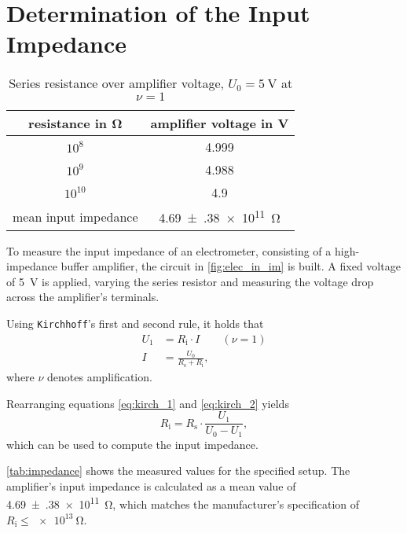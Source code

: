 \section{Determination of the Input Impedance}
\begin{table}[b!]
	\centering
	\caption[Series resistance over amplifier voltage]{Series resistance over amplifier voltage, $U_0=\SI{5}{\volt}$ at $\nu=1$}
	\label{tab:impedance}
	\begin{tabular}{cS}
		\toprule
		{resistance in \si{\ohm}}	&	{amplifier voltage in \si{\volt}}	\\
		\midrule
			$10^8$	&	4.999	\\
			$10^9$	&	4.988	\\
			$10^{10}$	&	4.9	\\
		\midrule
		{mean input impedance}	&	\SI{4.69(38)e11}{\ohm}\\
		\bottomrule
	\end{tabular}
\end{table}
To measure the input impedance of an electrometer, consisting of a high-impedance buffer amplifier, the circuit in \autoref{fig:elec_in_im} is built.
A fixed voltage of \SI{5}{\volt} is applied, varying the series resistor and measuring the voltage drop across the amplifier's terminals.

Using \texttt{Kirchhoff}'s first and second rule, it holds that
\begin{align}
	U_1	&= 	R_\text{i}\cdot I \label{eq:kirch_1}\qquad(\nu = 1)\\
	I 					&=	\frac{U_0}{R_\text{s}+R_\text{i}},	\label{eq:kirch_2}
\end{align}
where $\nu$ denotes amplification.

Rearranging equations \ref{eq:kirch_1} and \ref{eq:kirch_2} yields
\begin{equation}
	R_\text{i}=R_\text{s}\cdot\frac{U_1}{U_0-U_1},
\end{equation}
which can be used to compute the input impedance.

\autoref{tab:impedance} shows the measured values for the specified setup.
The amplifier's input impedance is calculated as a mean value of \SI{4.69(38)e11}{\ohm}, which matches the manufacturer's specification of $R_\text{i}\leq\SI{e13}{\ohm}$.
